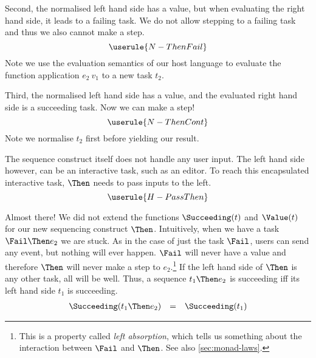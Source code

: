 Second,
the normalised left hand side has a value,
but when evaluating the right hand side,
it leads to a failing task.
We do not allow stepping to a failing task
and thus we also cannot make a step.
\begin{equation*}
  \userule{N-ThenFail}
\end{equation*}
Note we use the evaluation semantics of our host language
to evaluate the function application $e_2\ v_1$ to a new task $t_2$.

Third,
the normalised left hand side has a value,
and the evaluated right hand side is a succeeding task.
Now we can make a step!
\begin{equation*}
  \userule{N-ThenCont}
\end{equation*}
Note we normalise $t_2$ first before yielding our result.

The sequence construct itself does not handle any user input.
The left hand side however,
can be an interactive task, such as an editor.
To reach this encapsulated interactive task,
$\Then$ needs to pass inputs to the left.
\begin{equation*}
  \userule{H-PassThen}
\end{equation*}

Almost there!
We did not extend the functions $\Succeeding(t)$ and $\Value(t)$ for our new sequencing construct $\Then$.
Intuitively,
when we have a task $\Fail \Then e_2$ we are stuck.
As in the case of just the task $\Fail$,
users can send any event,
but nothing will ever happen.
$\Fail$ will never have a value
and therefore $\Then$ will never make a step to $e_2$.\footnote{
  This is a property called \emph{left absorption},
  which tells us something about the interaction between $\Fail$ and $\Then$.
  See also \autoref{sec:monad-laws}.
}
If the left hand side of $\Then$ is any other task,
all will be well.
Thus,
a sequence $t_1 \Then e_2$ is succeeding iff its left hand side $t_1$ is succeeding.
\begin{equation*}
  \begin{array}{lcl}
    \Succeeding(t_1 \Then e_2) &=& \Succeeding(t_1)
  \end{array}
\end{equation*}

